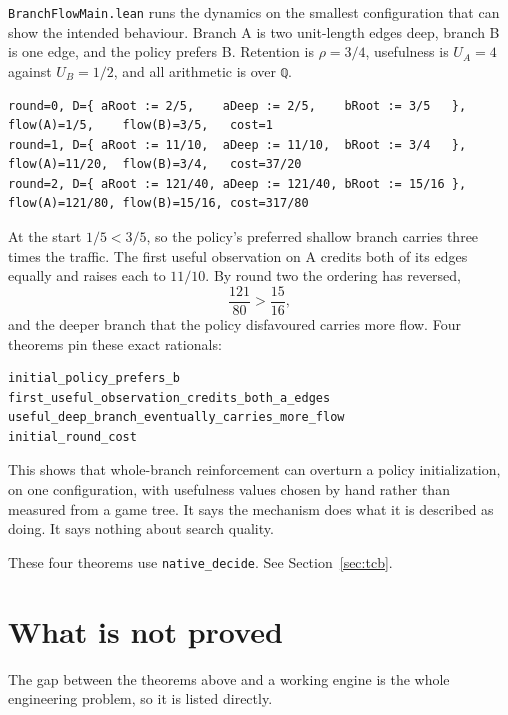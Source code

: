 \documentclass[11pt,a4paper]{article}
\theoremstyle{definition}
\newcommand{\lean}[1]{\texttt{#1}}
\begin{document}
\lean{BranchFlowMain.lean} runs the dynamics on the smallest configuration that
can show the intended behaviour. Branch A is two unit-length edges deep, branch
B is one edge, and the policy prefers B. Retention is $\rho = 3/4$, usefulness
is $U_A = 4$ against $U_B = 1/2$, and all arithmetic is over \lean{ℚ}.

\begin{Verbatim}[fontsize=\scriptsize,xleftmargin=0pt]
round=0, D={ aRoot := 2/5,    aDeep := 2/5,    bRoot := 3/5   }, flow(A)=1/5,    flow(B)=3/5,   cost=1
round=1, D={ aRoot := 11/10,  aDeep := 11/10,  bRoot := 3/4   }, flow(A)=11/20,  flow(B)=3/4,   cost=37/20
round=2, D={ aRoot := 121/40, aDeep := 121/40, bRoot := 15/16 }, flow(A)=121/80, flow(B)=15/16, cost=317/80
\end{Verbatim}

At the start $1/5 < 3/5$, so the policy's preferred shallow branch carries three
times the traffic. The first useful observation on A credits both of its edges
equally and raises each to $11/10$. By round two the ordering has reversed,
\begin{equation}
  \frac{121}{80} > \frac{15}{16},
\end{equation}
and the deeper branch that the policy disfavoured carries more flow. Four
theorems pin these exact rationals:

\begin{Verbatim}[fontsize=\small,xleftmargin=1em]
initial_policy_prefers_b
first_useful_observation_credits_both_a_edges
useful_deep_branch_eventually_carries_more_flow
initial_round_cost
\end{Verbatim}

This shows that whole-branch reinforcement can overturn a policy
initialization, on one configuration, with usefulness values chosen by hand
rather than measured from a game tree. It says the mechanism does what it is
described as doing. It says nothing about search quality.

These four theorems use \lean{native\_decide}. See Section~\ref{sec:tcb}.

\section{What is not proved}
\label{sec:notproved}

The gap between the theorems above and a working engine is the whole
engineering problem, so it is listed directly.
\end{document}
